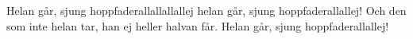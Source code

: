 	
\beginverse*
Helan går, 
sjung hoppfaderallallallallej
helan går, 
sjung hoppfaderallallej!
Och den som inte helan tar, 
han ej heller halvan får. 
Helan går, 
sjung hoppfaderallallej!			
\endverse									
\endsong							
